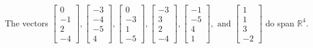 \begin{exercise}
\begin{exerciseStatement}
  \end{exerciseStatement}
  \begin{exerciseAnswer}
   The vectors \(\left[\begin{array}{r}
0 \\
-1 \\
2 \\
-4
\end{array}\right] , \left[\begin{array}{r}
-3 \\
-4 \\
-5 \\
4
\end{array}\right] , \left[\begin{array}{r}
0 \\
-3 \\
1 \\
-5
\end{array}\right] , \left[\begin{array}{r}
-3 \\
3 \\
2 \\
-4
\end{array}\right] , \left[\begin{array}{r}
-1 \\
-5 \\
4 \\
1
\end{array}\right] , \text{ and } \left[\begin{array}{r}
1 \\
1 \\
3 \\
-2
\end{array}\right]\) 
  	 do  
	span \(\mathbb{R}^4\).
  


  \end{exerciseAnswer}
\end{exercise}